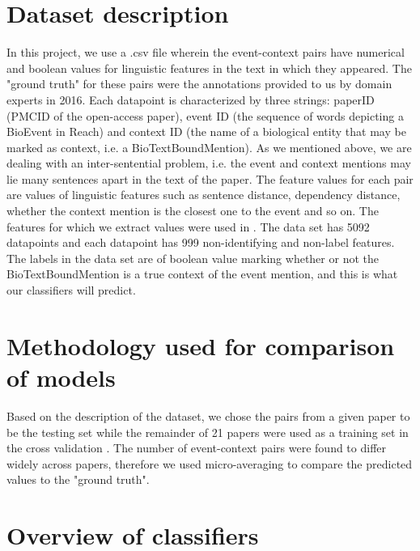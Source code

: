 \documentclass[10pt]{article}
\begin{document}
\section{Dataset description}
In this project, we use a .csv file wherein the event-context pairs have numerical and boolean values for linguistic features in the text in which they appeared. The "ground truth" for these pairs were the annotations provided to us by domain experts in 2016. Each datapoint is characterized by three strings: paperID (PMCID of the open-access paper), event ID (the sequence of words depicting a BioEvent in Reach) and context ID (the name of a biological entity that may be marked as context, i.e. a BioTextBoundMention).
As we mentioned above, we are dealing with an inter-sentential problem, i.e. the event and context mentions may lie many sentences apart in the text of the paper. The feature values for each pair are values of linguistic features such as sentence distance, dependency distance, whether the context mention is the closest one to the event and so on. The features for which we extract values were used in \cite{context_assoc_paper}. The data set has 5092 datapoints and each datapoint has 999 non-identifying and non-label features. The labels in the data set are of boolean value marking whether or not the BioTextBoundMention is a true context of the event mention, and this is what our classifiers will predict.



\section {Methodology used for comparison of models}
Based on the description of the dataset, we chose the pairs from a given paper to be the testing set while the remainder of 21 papers were used as a training set in the cross validation \cite{context_assoc_paper}.
The number of event-context pairs were found to differ widely across papers, therefore we used micro-averaging to compare the predicted values to the "ground truth".



\section{Overview of classifiers}
\end{document}
